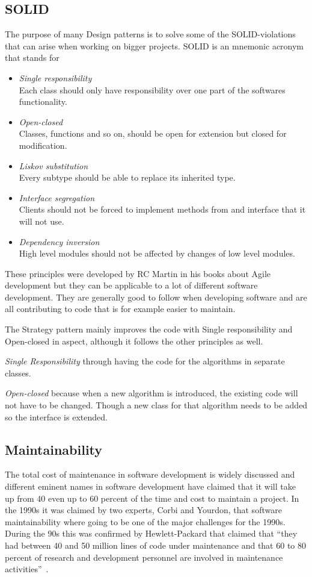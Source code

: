 \documentclass[conference, a4paper]{IEEEtran}
\begin{document}
\subsection{SOLID}
The purpose of many Design patterns is to solve some of the SOLID-violations that can arise when working on bigger projects. SOLID is an mnemonic acronym that stands for
\begin{itemize}
    \item \emph{Single responsibility} \\
    Each class should only have responsibility over one part of the softwares functionality.
    \item \emph{Open-closed} \\
    Classes, functions and so on, should be open for extension but closed for modification.
    \item \emph{Liskov substitution} \\
    Every subtype should be able to replace its inherited type.
    \item \emph{Interface segregation} \\
    Clients should not be forced to implement methods from and interface that it will not use.
    \item \emph{Dependency inversion} \\
    High level modules should not be affected by changes of low level modules.
\end{itemize}

These principles were developed by RC Martin in his books about Agile development but they can be applicable to a lot of different software development. They are generally good to follow when developing software and are all contributing to code that is for example easier to maintain.~\cite{bibitem:Bob}

The Strategy pattern mainly improves the code with Single responsibility and Open-closed in aspect, although it follows the other principles as well.

\textit{Single Responsibility} through having the code for the algorithms in separate classes.

\textit{Open-closed} because when a new algorithm is introduced, the existing code will not have to be changed. Though a new class for that algorithm needs to be added so the interface is extended.

\subsection{Maintainability}
\label{sec:Maintainability}
The total cost of maintenance in software development is widely discussed and different eminent names in software development have claimed that it will take up from 40 even up to 60 percent of the time and cost to maintain a project. In the 1990s it was claimed by two experts, Corbi and Yourdon, that software maintainability where going to be one of the major challenges for the 1990s. During the 90s this was confirmed by Hewlett-Packard that claimed that ``they had between 40 and 50 million lines of code under maintenance and that 60 to 80 percent of research and development personnel are involved in maintenance activities''~\cite{bibitem:MetricsToEvaluate}.
\end{document}
